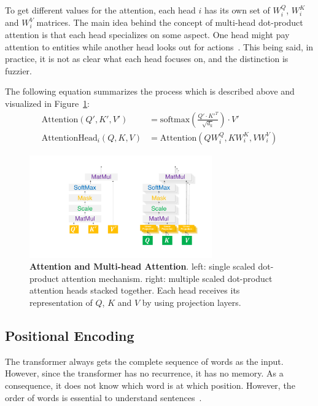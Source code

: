 To get different values for the attention, each head $i$ has its own set of $W_i^Q$, $W_i^K$ and $W_i^V$ matrices. The main idea behind the concept of multi-head dot-product attention is that each head specializes on some aspect. One head might pay attention to entities while another head looks out for actions~\cite{Vaswani2017d}. This being said, in practice, it is not as clear what each head focuses on, and the distinction is fuzzier.

The following equation summarizes the process which is described above and visualized in Figure~\ref{fig:03_transformer_scaledDotProduct}:
\begin{align}
    \text{Attention}(Q', K', V') & = \text{softmax}(\frac{Q' \cdot K'^T}{\sqrt{d_k}}) \cdot V' \\
    \text{AttentionHead}_i(Q, K, V) & = \text{Attention}(QW_i^Q, KW_i^K, VW_i^V)
\end{align}

\begin{figure}[htp]
    \centering
    \includegraphics[width=0.7\textwidth]{figures/03_theory/03_transformer_ScaledDot}
    \caption{\textbf{Attention and Multi-head Attention}. left: single scaled dot-product attention mechanism. right: multiple scaled dot-product attention heads stacked together. Each head receives its representation of $Q$, $K$ and $V$ by using projection layers.}
    \label{fig:03_transformer_scaledDotProduct}
\end{figure}

\subsection{Positional Encoding}

The transformer always gets the complete sequence of words as the input. However, since the transformer has no recurrence, it has no memory. As a consequence, it does not know which word is at which position. However, the order of words is essential to understand sentences~\cite{Vaswani2017d}. 
\medskip

